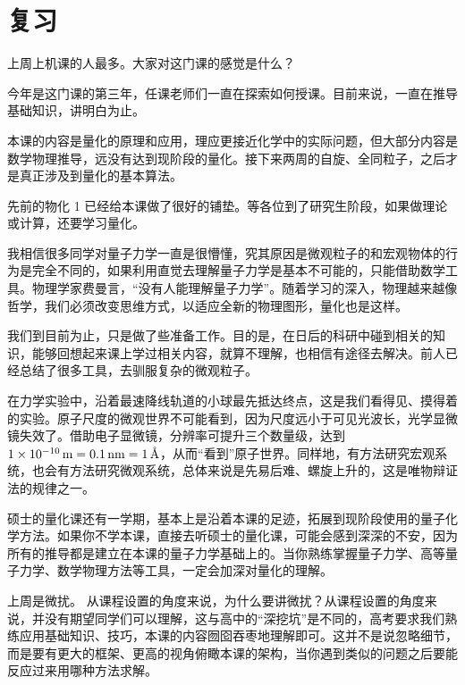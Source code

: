 \section{复习}

上周上机课的人最多。大家对这门课的感觉是什么？

今年是这门课的第三年，任课老师们一直在探索如何授课。目前来说，一直在推导基础知识，讲明白为止。

本课的内容是量化的原理和应用，理应更接近化学中的实际问题，但大部分内容是数学物理推导，远没有达到现阶段的量化。接下来两周的自旋、全同粒子，之后才是真正涉及到量化的基本算法。

先前的物化 1 已经给本课做了很好的铺垫。等各位到了研究生阶段，如果做理论或计算，还要学习量化。

我相信很多同学对量子力学一直是很懵懂，究其原因是微观粒子的和宏观物体的行为是完全不同的，如果利用直觉去理解量子力学是基本不可能的，只能借助数学工具。物理学家费曼言，``没有人能理解量子力学''。随着学习的深入，物理越来越像哲学，我们必须改变思维方式，以适应全新的物理图形，量化也是这样。

我们到目前为止，只是做了些准备工作。目的是，在日后的科研中碰到相关的知识，能够回想起来课上学过相关内容，就算不理解，也相信有途径去解决。前人已经总结了很多工具，去驯服复杂的微观粒子。

在力学实验中，沿着最速降线轨道的小球最先抵达终点，这是我们看得见、摸得着的实验。原子尺度的微观世界不可能看到，因为尺度远小于可见光波长，光学显微镜失效了。借助电子显微镜，分辨率可提升三个数量级，达到 $\SI{1E-10}{\metre} = \SI{0.1}{\nano\metre} = \SI{1}{\angstrom}$，从而``看到''原子世界。同样地，有方法研究宏观系统，也会有方法研究微观系统，总体来说是先易后难、螺旋上升的，这是唯物辩证法的规律之一。

硕士的量化课还有一学期，基本上是沿着本课的足迹，拓展到现阶段使用的量子化学方法。如果你不学本课，直接去听硕士的量化课，可能会感到深深的不安，因为所有的推导都是建立在本课的量子力学基础上的。当你熟练掌握量子力学、高等量子力学、数学物理方法等工具，一定会加深对量化的理解。


上周是微扰。
从课程设置的角度来说，为什么要讲微扰？从课程设置的角度来说，并没有期望同学们可以理解，这与高中的``深挖坑''是不同的，高考要求我们熟练应用基础知识、技巧，本课的内容囫囵吞枣地理解即可。这并不是说忽略细节，而是要有更大的框架、更高的视角俯瞰本课的架构，当你遇到类似的问题之后要能反应过来用哪种方法求解。

